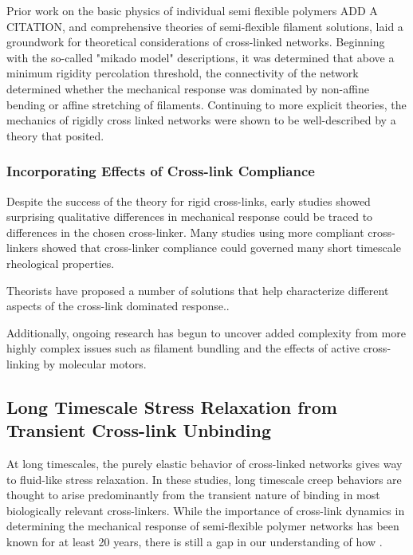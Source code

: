 \documentclass[pre,reprint]{revtex4-1}
\begin{document}
Prior work on the basic physics of individual semi flexible polymers ADD A CITATION, and comprehensive theories of semi-flexible filament solutions, \cite{theo_morse} laid a groundwork for theoretical considerations of cross-linked networks. Beginning with the so-called "mikado model" descriptions\cite{theo_hlm,theo_hlm2}, it was determined that above a minimum rigidity percolation threshold, the connectivity of the network determined whether the mechanical response was dominated by non-affine bending or affine stretching of filaments.   Continuing to more explicit theories\cite{theo_best}, the mechanics of rigidly cross linked networks were shown to be well-described by a theory that posited.  

\subsubsection{Incorporating Effects of Cross-link Compliance}

Despite the success of the theory for rigid cross-links, early studies showed surprising qualitative differences in mechanical response could be traced to differences in the chosen cross-linker.  Many studies using more compliant cross-linkers showed that cross-linker compliance could governed many short timescale rheological properties\cite{rheo_crosslink_nonlin1,rheo_crosslink_nonlin2,rheo_crosslink_nonlin3,rheo_crosslink_notactin,rheo_crosslinkcompare,rheo_crosslinkreview}. 

Theorists have proposed a number of solutions that help characterize different aspects of the cross-link dominated response.\cite{theo_nonaffine2,theo_floppy,theo_crosslinknonlinear}.

Additionally, ongoing research has begun to uncover added complexity from more highly complex issues such as filament bundling and the effects of active cross-linking by molecular motors.  

\subsection{Long Timescale Stress Relaxation from Transient Cross-link Unbinding}

At long timescales, the purely elastic behavior of cross-linked networks gives way to fluid-like stress relaxation. In these studies, long timescale creep behaviors are thought to arise predominantly from the transient nature of binding in most biologically relevant cross-linkers\cite{rheo_crosslinkslip1,rheo_crosslinkslip2,rheo_crosslinkslip3,rheo_nonaffine}.  While the importance of cross-link dynamics in determining the mechanical response of semi-flexible polymer networks has been known for at least 20 years\cite{rheo_crosslinksmatter}, there is still a gap in our understanding of how . 
\end{document}
